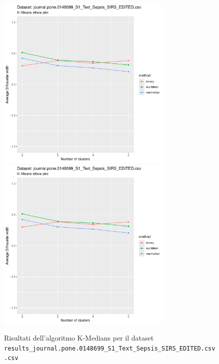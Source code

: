 \documentclass[12pt]{report}
\begin{document}
			\begin{figure}[h]
				\centering
				\includegraphics[width = 0.75\textwidth, height = 0.45\textheight, page = 3]{
					results/results_journal.pone.0148699_S1_Text_Sepsis_SIRS_EDITED.csv.pdf
				}
				\includegraphics[width = 0.75\textwidth, height = 0.45\textheight, page = 4]{
					results/results_journal.pone.0148699_S1_Text_Sepsis_SIRS_EDITED.csv.pdf
				}
				\caption{Risultati dell'algoritmo K-Medians per il dataset
				\texttt{results\_journal.pone.0148699\_S1\_Text\_Sepsis\_SIRS\_EDITED.csv.csv}}
				\label{fig:kmedians5}
			\end{figure}
\end{document}

